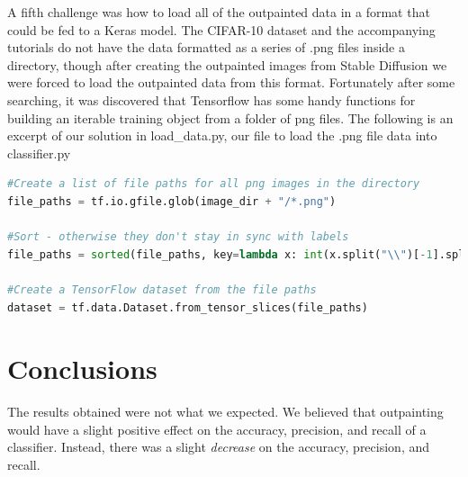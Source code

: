 \documentclass[conference]{IEEEtran}
\begin{document}
A fifth challenge was how to load all of the outpainted data in a format that could be fed to a Keras model. The CIFAR-10 dataset and the accompanying tutorials do not have the data formatted as a series of .png files inside a directory, though after creating the outpainted images from Stable Diffusion we were forced to load the outpainted data from this format. Fortunately after some searching, it was discovered that Tensorflow has some handy functions for building an iterable training object from a folder of png files. The following is an excerpt of our solution in load\_data.py, our file to load the .png file data into classifier.py

\begin{lstlisting}[language=Python, basicstyle=\tiny]
#Create a list of file paths for all png images in the directory
file_paths = tf.io.gfile.glob(image_dir + "/*.png")

#Sort - otherwise they don't stay in sync with labels
file_paths = sorted(file_paths, key=lambda x: int(x.split("\\")[-1].split(".")[0]))

#Create a TensorFlow dataset from the file paths
dataset = tf.data.Dataset.from_tensor_slices(file_paths)
\end{lstlisting}

\section{Conclusions}\label{conc}

The results obtained were not what we expected. We believed that outpainting would have a slight positive effect on the accuracy, precision, and recall of a classifier. Instead, there was a slight \emph{decrease} on the accuracy, precision, and recall.
\end{document}
